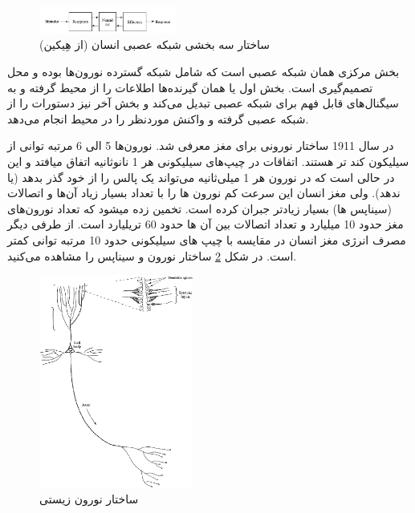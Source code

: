 \documentclass[11pt,a4paper,twocolumn]{article}
\begin{document}
\begin{figure}
  \centering
    \includegraphics[width=0.4\textwidth]{three-parts.png}
  \caption{ساختار سه بخشی شبکه عصبی انسان (از هِیکین\cite{haykin})}
  \label{fig:three-parts}
\end{figure}

بخش مرکزی همان شبکه عصبی است که شامل شبکه گسترده نورون‌ها بوده و محل تصمیم‌گیری است. بخش اول یا همان گیرنده‌ها اطلاعات را از محیط گرفته و به سیگنال‌های قابل فهم برای شبکه عصبی تبدیل می‌کند و بخش آخر نیز دستورات را از شبکه عصبی گرفته و واکنش موردنظر را در محیط انجام می‌دهد.

در سال 1911 ساختار نورونی 
برای مغز معرفی شد. نورون‌ها 5 الی 6 مرتبه توانی از سیلیکون کند تر هستند. اتفاقات در چیپ‌های سیلیکونی هر 1 نانوثانیه اتفاق میافتد و این در حالی است که در نورون هر 1 میلی‌‌ثانیه می‌تواند یک پالس را از خود گذر بدهد (یا ندهد). ولی مغز انسان این سرعت کم نورون ها را  با تعداد بسیار زیاد آن‌ها و اتصالات (سیناپس ها) بسیار زیادتر جبران کرده است. تخمین زده میشود که تعداد نورون‌های مغز حدود 10 میلیارد و تعداد اتصالات بین آن ها حدود 60 تریلیارد است. از طرفی دیگر مصرف انرژی مغز انسان در مقایسه با چیپ های سیلیکونی حدود 10 مرتبه توانی کمتر است. در شکل
\ref{fig:bio-neuron}
ساختار نورون و سیناپس را مشاهده می‌کنید.

\begin{figure}
  \centering
    \includegraphics[width=0.45\textwidth, height=0.5\textwidth]{bio-neuron.png}
  \caption{ساختار نورون زیستی \cite{haykin}}
  \label{fig:bio-neuron}
\end{figure}
\end{document}
